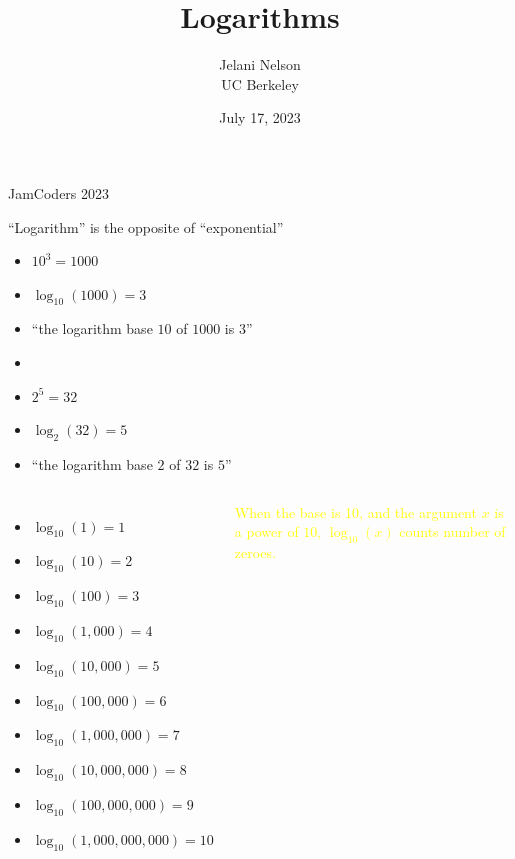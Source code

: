 \documentclass{beamer}
\title[Logarithms\hspace{2em}\insertframenumber/
\inserttotalframenumber]{Logarithms}
\author{Jelani Nelson\\UC Berkeley}
\date[\today]
{July 17, 2023}
\renewcommand{\alert}[1]{\textcolor{MyTeal}{#1}}
\begin{document}
\begin{frame}
  \titlepage

  \begin{center}
    {\tiny \alert{JamCoders 2023}}
  \end{center}
\end{frame}

\begin{frame}
  ``Logarithm'' is the opposite of ``exponential''

  \pause

  \bigskip

  \begin{itemize}
  \item $10^3 = 1000$
  \item[] $\log_{10}(1000) = 3$
    \item[] \alert{``the logarithm base $10$ of $1000$ is $3$''}
    \item[]
  \item $2^5 = 32$
  \item[] $\log_2(32) = 5$
        \item[] \alert{``the logarithm base $2$ of $32$ is $5$''}
    \end{itemize}
  \end{frame}

  \begin{frame}
    \begin{columns}
      \column{2in}
    \begin{itemize}
    \item[] $\log_{10}(1) = 1$
    \item[] $\log_{10}(10) = 2$
    \item[] $\log_{10}(100) = 3$
    \item[] $\log_{10}(1{,}000) = 4$
    \item[] $\log_{10}(10{,}000) = 5$
    \item[] $\log_{10}(100{,}000) = 6$
    \item[] $\log_{10}(1{,}000{,}000) = 7$
    \item[] $\log_{10}(10{,}000{,}000) = 8$
    \item[] $\log_{10}(100{,}000{,}000) = 9$
    \item[] $\log_{10}(1{,}000{,}000{,}000) = 10$      
    \end{itemize}
    \column{3in}
    \textcolor{yellow}{When the \alert{base} is 10, and the argument $x$ is a power of $10$, $\log_{10}(x)$ counts number of zeroes.}
    \end{columns}
  \end{frame}
\end{document}
